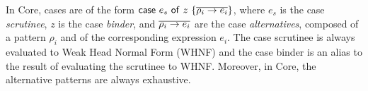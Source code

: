 \documentclass[acmsmall,review,screen]{acmart}
\newcommand{\parawith}[1]{\paragraph{\emph{#1}}}
\newcommand{\ccase}[2]{\mathsf{case}~#1~\mathsf{of}~#2}
\begin{document}
In Core, cases are of the form $\ccase{e_s}{z~\{\ov{\rho_i \to e_i}\}}$,
where $e_s$ is the case \emph{scrutinee}, $z$ is the case \emph{binder}, and
$\overline{\rho_i \to e_i}$ are the case \emph{alternatives}, composed of a pattern
$\rho_i$ and of the corresponding expression $e_i$. 
The case scrutinee is always evaluated to Weak Head Normal Form (WHNF) and
%
%
the case binder is an alias to the result of evaluating the scrutinee
to WHNF. Moreover, in Core, the alternative patterns are always exhaustive.


\end{document}
